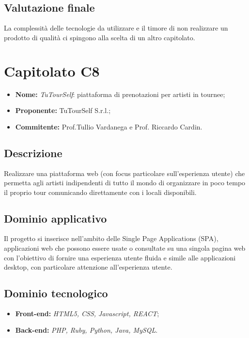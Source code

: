 \documentclass[openany,12pt,a4paper]{report}
\begin{document}
	\subsection{Valutazione finale}
	
	La complessità delle tecnologie da utilizzare e il timore di non realizzare un prodotto di qualità ci spingono alla scelta di un altro capitolato.
	
	
	\section{Capitolato C8}
	
	\begin{itemize}
		\item \textbf{Nome:} \textit{TuTourSelf}: piattaforma di prenotazioni per artisti in tournee;
		\item \textbf{Proponente:} TuTourSelf S.r.l.;
		\item \textbf{Commitente:} Prof.Tullio Vardanega e Prof. Riccardo Cardin.
	\end{itemize}
	
	\subsection{Descrizione}
	
	Realizzare una piattaforma web (con focus particolare sull'esperienza utente) che permetta agli artisti indipendenti di tutto il mondo di organizzare in poco tempo il proprio tour comunicando direttamente con i locali disponibili.
	
	\subsection{Dominio applicativo}
	
	Il progetto si inserisce nell'ambito delle Single Page Applications (SPA), applicazioni web che possono essere usate o consultate su una singola pagina web con l'obiettivo di fornire una esperienza utente fluida e simile alle applicazioni desktop, con particolare attenzione all'esperienza utente.
	
	\subsection{Dominio tecnologico}
	
	\begin{itemize}
		\item \textbf{Front-end:} \textit{HTML5, CSS, Javascript, REACT};
		\item \textbf{Back-end:}  \textit{PHP, Ruby, Python, Java, MySQL}.
	\end{itemize}
	
\end{document}
